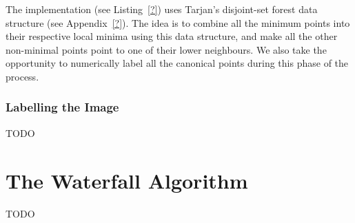 The implementation (see Listing~\ref{?}) uses Tarjan's disjoint-set forest data structure (see Appendix~\ref{?}). The idea is to combine all the minimum points into their respective local minima using this data structure, and make all the other non-minimal points point to one of their lower neighbours. We also take the opportunity to numerically label all the canonical points during this phase of the process.


\subsubsection{Labelling the Image}

TODO

\section{The Waterfall Algorithm}

TODO
